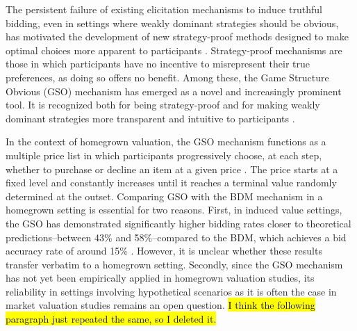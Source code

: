 \documentclass[12pt]{article}
\begin{document}
The persistent failure of existing elicitation mechanisms to induce truthful bidding, even in settings where weakly dominant strategies should be obvious, has motivated the development of new strategy-proof methods designed to make optimal choices more apparent to participants \citep{li_obviously_2017, pycia_theory_2023}. Strategy-proof mechanisms are those in which participants have no incentive to misrepresent their true preferences, as doing so offers no benefit. Among these, the Game Structure Obvious (GSO) mechanism has emerged as a novel and increasingly prominent tool. It is recognized both for being strategy-proof and for making weakly dominant strategies more transparent and intuitive to participants \citep{chakraborty_future_2025}. 

In the context of homegrown valuation, the GSO mechanism functions as a multiple price list in which participants progressively choose, at each step, whether to purchase or decline an item at a given price \citep{yu2021multiple, herberich2012digging, jack2022multiple}.  The price starts at a fixed level and constantly increases until it reaches a terminal value randomly determined at the outset. Comparing GSO with the BDM mechanism in a homegrown setting is essential for two reasons. First, in induced value settings, the GSO  has demonstrated significantly higher bidding rates closer to theoretical predictions--between 43\% and 58\%--compared to the BDM, which achieves a bid accuracy rate of around 15\% \citep{chakraborty_future_2025}. However, it is unclear whether these results transfer verbatim to a homegrown setting. Secondly, since the GSO mechanism has not yet been empirically applied in homegrown valuation studies, its reliability in settings involving hypothetical scenarios as it is often the case in market valuation studies remains an open question. \hl{I think the following paragraph just repeated the same, so I deleted it.}

\end{document}
